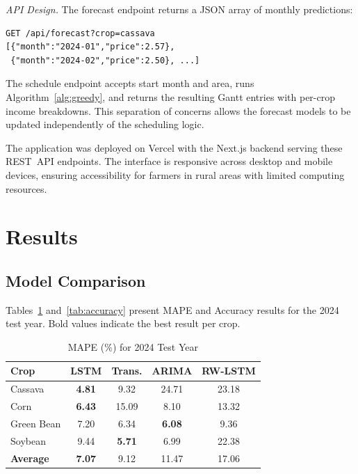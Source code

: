 \documentclass[journal]{IEEEtran}
\begin{document}
\textit{API Design.} The forecast endpoint returns a JSON array of monthly predictions:

\begin{verbatim}
GET /api/forecast?crop=cassava
[{"month":"2024-01","price":2.57},
 {"month":"2024-02","price":2.50}, ...]
\end{verbatim}

\noindent The schedule endpoint accepts start month and area, runs Algorithm~\ref{alg:greedy}, and returns the resulting Gantt entries with per-crop income breakdowns. This separation of concerns allows the forecast models to be updated independently of the scheduling logic.

The application was deployed on Vercel with the Next.js backend serving these REST~API endpoints. The interface is responsive across desktop and mobile devices, ensuring accessibility for farmers in rural areas with limited computing resources.

\section{Results}
\label{sec:results}

\subsection{Model Comparison}

Tables~\ref{tab:mape} and~\ref{tab:accuracy} present MAPE and Accuracy results for the 2024 test year. Bold values indicate the best result per crop.

\begin{table}[htbp]
  \centering
  \caption{MAPE (\%) for 2024 Test Year}
  \label{tab:mape}
  \begin{tabular}{lcccc}
    \toprule
    \textbf{Crop} & \textbf{LSTM} & \textbf{Trans.} & \textbf{ARIMA} & \textbf{RW-LSTM} \\
    \midrule
    Cassava    & \textbf{4.81}  & 9.32  & 24.71 & 23.18 \\
    Corn       & \textbf{6.43}  & 15.09 & 8.10  & 13.32 \\
    Green Bean & 7.20           & 6.34  & \textbf{6.08}  & 9.36  \\
    Soybean    & 9.44           & \textbf{5.71} & 6.99 & 22.38 \\
    \midrule
    \textbf{Average} & \textbf{7.07} & 9.12 & 11.47 & 17.06 \\
    \bottomrule
  \end{tabular}
\end{table}
\end{document}
